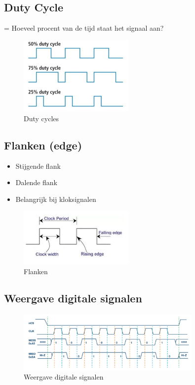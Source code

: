 \documentclass{article}
\begin{document}
\subsection{Duty Cycle}
= Hoeveel procent van de tijd staat het signaal aan?

\begin{figure}[H]
    \centering
    \includegraphics[width=0.5\textwidth]{Screenshot_20200315_120616.png}
    \caption{Duty cycles}
\end{figure}

\subsection{Flanken (edge)}
\begin{itemize}
    \item Stijgende flank
    \item Dalende flank
    \item Belangrijk bij kloksignalen
\end{itemize}

\begin{figure}[H]
    \centering
    \includegraphics[width=0.5\textwidth]{Screenshot_20200217_123230.png}
    \caption{Flanken}
\end{figure}

\subsection{Weergave digitale signalen}

\begin{figure}[H]
    \centering
    \includegraphics[width=0.8\textwidth]{Screenshot_20200217_125726.png}
    \caption{Weergave digitale signalen}
\end{figure}
\end{document}
